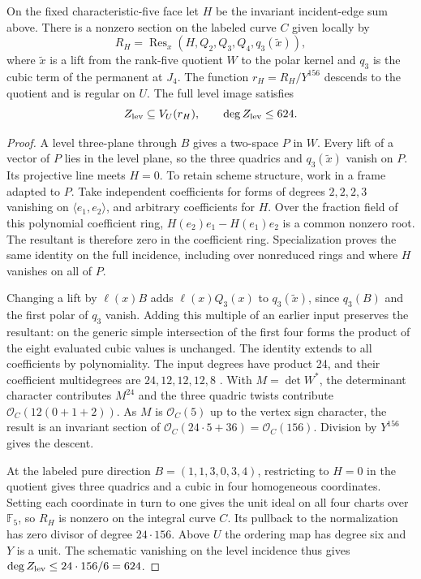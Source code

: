 \begin{proposition}
\label{prop:cubic-level-bound}
On the fixed characteristic-five face let \(H\) be the invariant
incident-edge sum above. There is a nonzero section on the labeled
curve \(C\) given locally by
\[
 R_H=\operatorname{Res}_x(H,Q_2,Q_3,Q_4,q_3(\widetilde x)),
\]
where \(\widetilde x\) is a lift from the rank-five quotient \(W\) to the
polar kernel and \(q_3\) is the cubic term of the permanent at \(J_4\).
The function \(r_H=R_H/Y^{156}\) descends to the quotient and is regular
on \(U\). The full level image satisfies
\[
             Z_{\rm lev}\subseteq V_U(r_H),\qquad
             \deg Z_{\rm lev}\le 624.
\]
\end{proposition}

\begin{proof}
A level three-plane through \(B\) gives a two-space \(P\) in \(W\).
Every lift of a vector of \(P\) lies in the level plane, so the three
quadrics and \(q_3(\widetilde x)\) vanish on \(P\). Its projective
line meets \(H=0\). To retain scheme structure, work in a frame adapted
to \(P\). Take independent coefficients for forms of degrees \(2,2,2,3\)
vanishing on \(\langle e_1,e_2\rangle\), and
arbitrary coefficients for \(H\). Over the fraction field of this
polynomial coefficient ring, \(H(e_2)e_1-H(e_1)e_2\) is a common
nonzero root. The resultant is therefore zero in the coefficient ring.
Specialization proves the same identity on the full incidence, including
over nonreduced rings and where \(H\) vanishes on all of \(P\).

Changing a lift by \(\ell(x)B\) adds \(\ell(x)Q_3(x)\) to
\(q_3(\widetilde x)\), since \(q_3(B)\) and the first polar of
\(q_3\) vanish. Adding this multiple of an earlier input preserves
the resultant: on the generic simple intersection of the first four
forms the product of the eight evaluated cubic values is unchanged.
The identity extends to all coefficients by polynomiality.
The input degrees have product 24, and their coefficient multidegrees
are \(24,12,12,12,8\) \cite{dandreaDickensteinResultant}. With
\(M=\det W^*\), the determinant character contributes \(M^{24}\) and
the three quadric twists contribute \(\mathcal O_C(12(0+1+2))\).
As \(M\) is \(\mathcal O_C(5)\) up to the vertex sign character, the
result is an invariant section of \(\mathcal O_C(24\cdot5+36)
=\mathcal O_C(156)\). Division by \(Y^{156}\) gives the descent.

At the labeled pure direction \(B=(1,1,3,0,3,4)\), restricting to
\(H=0\) in the quotient gives three quadrics and a cubic in four
homogeneous coordinates. Setting each coordinate in turn to one gives
the unit ideal on all four charts over \(\mathbb F_5\), so \(R_H\)
is nonzero on the integral curve \(C\). Its pullback to the normalization
has zero divisor of degree \(24\cdot156\). Above \(U\) the ordering
map has degree six and \(Y\) is a unit. The schematic vanishing on the
level incidence thus gives \(\deg Z_{\rm lev}\le24\cdot156/6=624\).
\end{proof}

